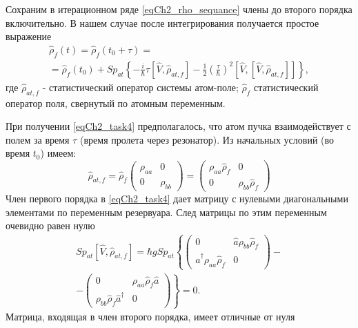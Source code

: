 Сохраним в итерационном ряде \eqref{eqCh2_rho_sequance} члены до
второго порядка включительно. В нашем случае после интегрирования
получается простое выражение  
\begin{eqnarray}
\hat{\rho}_{f}\left(t\right) =
\hat{\rho}_{f}\left(t_0 + \tau\right) = 
\nonumber \\
= \hat{\rho}_{f}\left(t_0\right) +
Sp_{at}
\left\{
- \frac{i}{\hbar}\tau\left[\hat{V}, \hat{\rho}_{at, f}\right]
- \frac{1}{2} \left(\frac{\tau}{\hbar}\right)^2
\left[\hat{V},\left[\hat{V}, \hat{\rho}_{at, f}
\right]\right]
\right\}, 
\label{eqCh2_task4}
\end{eqnarray}
где $\hat{\rho}_{at, f}$ -  статистический оператор системы атом-поле;
$\hat{\rho}_{f}$ статистический оператор поля, свернутый по
атомным переменным.
  
При получении \eqref{eqCh2_task4} предполагалось, что атом пучка
взаимодействует с полем за время $\tau$ (время пролета через
резонатор). Из начальных условий (во время $t_0$) имеем:  
\begin{equation}
\hat{\rho}_{at, f} = \hat{\rho}_{f}
\left(
\begin{array} {cc}
\rho_{aa} & 0  
\\
0 & \rho_{bb} 
\end{array}
\right) = 
\left(
\begin{array} {cc}
\rho_{aa}\hat{\rho}_{f} & 0  
\\
0 & \rho_{bb}\hat{\rho}_{f}
\end{array}
\right)
\end{equation}
Член первого порядка в \eqref{eqCh2_task4} дает матрицу с нулевыми
диагональными элементами по переменным резервуара. След матрицы по
этим переменным очевидно равен нулю  
\begin{eqnarray}
Sp_{at}\left[\hat{V}, \hat{\rho}_{at, f}\right] = 
\hbar g Sp_{at}
\left\{
\left(
\begin{array} {cc}
0 & \hat{a} \rho_{bb}\hat{\rho}_{f}  
\\
\hat{a}^{\dag} \rho_{aa}\hat{\rho}_{f}   & 0
\end{array}
\right)
\right.
-
\nonumber \\
-
\left.
\left(
\begin{array} {cc}
0 & \rho_{aa} \hat{\rho}_{f} \hat{a}   
\\
\rho_{bb} \hat{\rho}_{f} \hat{a}^{\dag}   & 0
\end{array}
\right)
\right\}
= 0.
\label{eqCh2_sp_1}
\end{eqnarray}
Матрица, входящая в член второго порядка, имеет отличные от нуля

